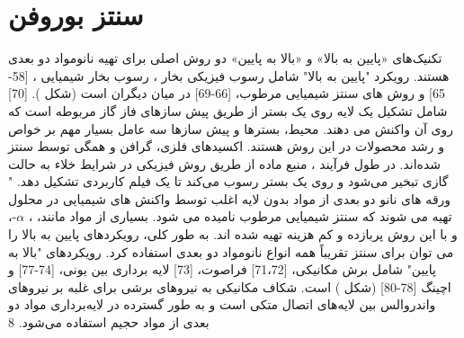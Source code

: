 \section{سنتز بوروفن}
تکنیک‌های «پایین به بالا» و «بالا به پایین» دو روش اصلی برای تهیه نانومواد دو بعدی هستند. رویکرد "پایین به بالا" شامل رسوب فیزیکی بخار ، \cite{parkCrystallizationInducedPropertiesMorphologyControlled2014, zhaoPatternedGrowthVertically2010, zhaoVerticalOrganicNanowire2009} رسوب بخار شیمیایی ،\cite{zhangReviewChemicalVapor2013, akhavanToxicityGrapheneGraphene2010} [58-65] و روش های سنتز شیمیایی مرطوب، \cite{hanSynthesisStructuralTransformations2013, wuWelldefinedBiOClColloidal2015}[66-69] در میان دیگران است (شکل ). \cite{mannixSynthesisChemistryElemental2017}[70]  شامل تشکیل یک لایه روی یک بستر از طریق پیش سازهای فاز گاز مربوطه است که روی آن واکنش می دهند. محیط، بسترها و پیش سازها سه عامل بسیار مهم بر خواص و رشد محصولات در این روش هستند. اکسیدهای فلزی، گرافن و  همگی توسط  سنتز شده‌اند. در طول فرآیند ، منبع ماده از طریق روش فیزیکی در شرایط خلاء به حالت گازی تبخیر می‌شود و روی یک بستر رسوب می‌کند تا یک فیلم کاربردی تشکیل دهد. "
ورقه های نانو دو بعدی از مواد بدون لایه اغلب توسط واکنش های شیمیایی در محلول تهیه می شوند که سنتز شیمیایی مرطوب نامیده می شود. بسیاری از مواد مانند، ، $\alpha$-،  و  با این روش پربازده و کم هزینه تهیه شده اند. به طور کلی، رویکردهای پایین به بالا را می توان برای سنتز تقریباً همه انواع نانومواد دو بعدی استفاده کرد. رویکردهای "بالا به پایین" شامل برش مکانیکی، \cite{liPreparationApplicationsMechanically2014, yiReviewMechanicalExfoliation2015}[71،72] فراصوت، \cite{nicolosiLiquidExfoliationLayered2013}[73] لایه برداری بین یونی، \cite{yuwenRapidPreparationSinglelayer2016, zengSingleLayerSemiconductingNanosheets2011}[74-77] و اچینگ \cite{anasoriTwoDimensionalOrderedDouble2015, naguibNewTwoDimensionalNiobium2013, naguibTwoDimensionalNanocrystalsProduced2011}[78-80] (شکل ) است. شکاف مکانیکی به نیروهای برشی برای غلبه بر نیروهای واندروالس بین لایه‌های اتصال متکی است و به طور گسترده در لایه‌برداری مواد دو بعدی از مواد حجیم استفاده می‌شود. 8
